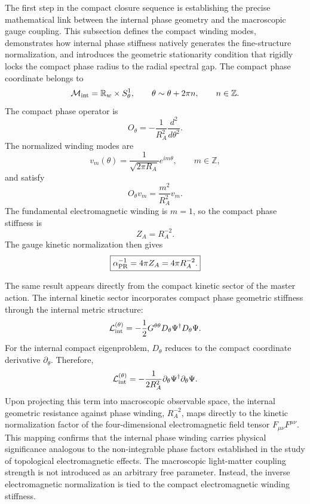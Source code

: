 \documentclass[11pt]{article}
\begin{document}
The first step in the compact closure sequence is establishing the precise mathematical link between the internal phase geometry and the macroscopic gauge coupling. This subsection defines the compact winding modes, demonstrates how internal phase stiffness natively generates the fine-structure normalization, and introduces the geometric stationarity condition that rigidly locks the compact phase radius to the radial spectral gap. The compact phase coordinate belongs to
\begin{equation}
\mathcal M_{\rm int}
=
\mathbb R_w\times S^1_\theta,
\qquad
\theta\sim\theta+2\pi n,
\qquad
n\in\mathbb Z.
\end{equation}
The compact phase operator is
\begin{equation}
O_\theta
=
-\frac{1}{R_A^2}
\frac{d^2}{d\theta^2}.
\end{equation}
The normalized winding modes are
\begin{equation}
v_m(\theta)
=
\frac{1}{\sqrt{2\pi R_A}}
e^{im\theta},
\qquad
m\in\mathbb Z,
\end{equation}
and satisfy
\begin{equation}
O_\theta v_m
=
\frac{m^2}{R_A^2}v_m.
\end{equation}
The fundamental electromagnetic winding is \(m=1\), so the compact phase
stiffness is
\begin{equation}
Z_A
=
R_A^{-2}.
\end{equation}
The gauge kinetic normalization then gives
\begin{equation}
\boxed{
\alpha_{\rm PR}^{-1}
=
4\pi Z_A
=
4\pi R_A^{-2}.
}
\end{equation}

The same result appears directly from the compact kinetic sector of the master
action. The internal kinetic sector incorporates compact phase geometric
stiffness through the internal metric structure:
\begin{equation}
\mathcal L_{\rm int}^{(\theta)}
=
-\frac12
G^{\theta\theta}
D_\theta\Psi^\dagger D_\theta\Psi.
\end{equation}
For the internal compact eigenproblem, \(D_\theta\) reduces to the compact
coordinate derivative \(\partial_\theta\). Therefore,
\begin{equation}
\mathcal L_{\rm int}^{(\theta)}
=
-\frac{1}{2R_A^2}
\partial_\theta\Psi^\dagger
\partial_\theta\Psi.
\end{equation}
Upon projecting this term into macroscopic observable space, the internal
geometric resistance against phase winding, \(R_A^{-2}\), maps directly to the
kinetic normalization factor of the four-dimensional electromagnetic field
tensor \(F_{\mu\nu}F^{\mu\nu}\). This mapping confirms that the internal phase
winding carries physical significance analogous to the non-integrable phase
factors established in the study of topological electromagnetic effects. The
macroscopic light-matter coupling strength is not introduced as an arbitrary
free parameter. Instead, the inverse electromagnetic normalization is tied to
the compact electromagnetic winding stiffness.
\end{document}
